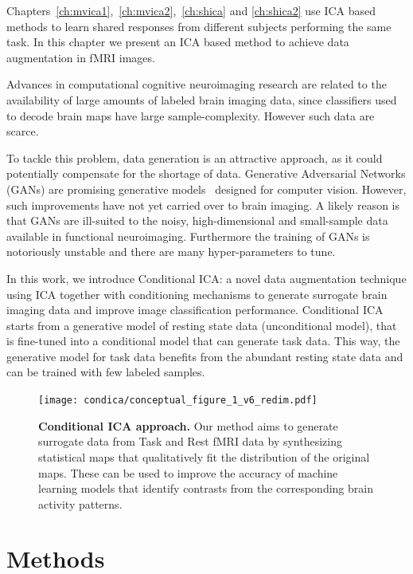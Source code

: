 Chapters~\ref{ch:mvica1},~\ref{ch:mvica2},~\ref{ch:shica} and
\ref{ch:shica2} use ICA based methods to learn shared responses from different
subjects performing the same task.
In this chapter we present an ICA based method to achieve data augmentation in fMRI images.

  Advances in computational cognitive neuroimaging research are
  related to the availability of large amounts of labeled brain
imaging data, since classifiers used to decode brain maps have large
sample-complexity.
%
However such data are scarce.
%

To tackle this problem, data generation is an attractive approach, as
it could potentially compensate for the shortage of data.
Generative Adversarial Networks (GANs) are promising generative
models~\cite{goodfellow2014generative} designed for computer vision.
% 
However, such improvements have not yet carried over to brain imaging. A likely
reason is that GANs are ill-suited to the noisy, high-dimensional and
small-sample data available in functional neuroimaging. 
% 
Furthermore the training of GANs is notoriously unstable and there are many hyper-parameters to tune.
% 

  In this work, we introduce Conditional ICA: a novel data augmentation technique using ICA together with conditioning mechanisms to generate surrogate brain imaging data and improve image classification performance.
  Conditional ICA starts from a generative model of resting state data (unconditional model), that is fine-tuned into a conditional model that can generate task data. 
  This way, the generative model for task data benefits from the abundant
  resting state data and can be trained with few labeled samples.


%
\begin{figure}
\centerline{\texttt{[image: condica/conceptual\_figure\_1\_v6\_redim.pdf]}}
\caption{\textbf{Conditional ICA approach.} Our method aims to
  generate surrogate data from Task and Rest fMRI data by synthesizing
  statistical maps that qualitatively fit the distribution of the
  original maps. These can be used to improve the accuracy of
  machine learning models that identify contrasts from the
  corresponding brain activity patterns.}
\label{Fig0}
\end{figure}



\section{Methods}

